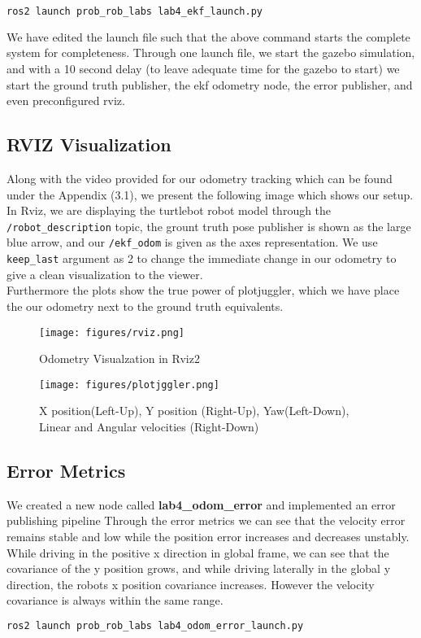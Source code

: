 \documentclass[14pt,letterpaper]{article}
\begin{document}
\begin{lstlisting}[language=bash]
ros2 launch prob_rob_labs lab4_ekf_launch.py
\end{lstlisting}

We have edited the launch file such that the above command starts the complete system for completeness.
Through one launch file, we start the gazebo simulation, and with a 10 second delay (to leave adequate time for the gazebo to start) we start the ground truth publisher,
the ekf odometry node, the error publisher, and even preconfigured rviz.

\subsection{RVIZ Visualization}

Along with the video provided for our odometry tracking which can be found under the Appendix (3.1), we present the following image which shows our setup.
In Rviz, we are displaying the turtlebot robot model through the \texttt{/robot\_description} topic, the grount truth pose publisher is shown as the large blue arrow, and
our \texttt{/ekf\_odom} is given as the axes representation. We use \texttt{keep\_last} argument as 2 to change the immediate change in our odometry to give a clean visualization to the viewer.
\\

Furthermore the plots show the true power of plotjuggler, which we have place the our odometry next to the ground truth equivalents.

\begin{figure}[H]
\centering
\texttt{[image: figures/rviz.png]}
\caption{Odometry Visualzation in Rviz2}
\label{fig:rviz}
\end{figure}

\begin{figure}[H]
\centering
\texttt{[image: figures/plotjggler.png]}
\caption{X position(Left-Up), Y position (Right-Up), Yaw(Left-Down), Linear and Angular velocities (Right-Down)}
\label{fig:Plotjuggler}
\end{figure}

\subsection{Error Metrics}

We created a new node called \textbf{lab4\_odom\_error} and implemented an error publishing pipeline
Through the error metrics we can see that the velocity error remains stable and low while the position error increases and decreases unstably.
While driving in the positive x direction in global frame, we can see that the covariance of the y position grows, and while driving laterally in the global y direction, the
robots x position covariance increases. However the velocity covariance is always within the same range.
\begin{lstlisting}[language=bash]
ros2 launch prob_rob_labs lab4_odom_error_launch.py
\end{lstlisting}
\end{document}
